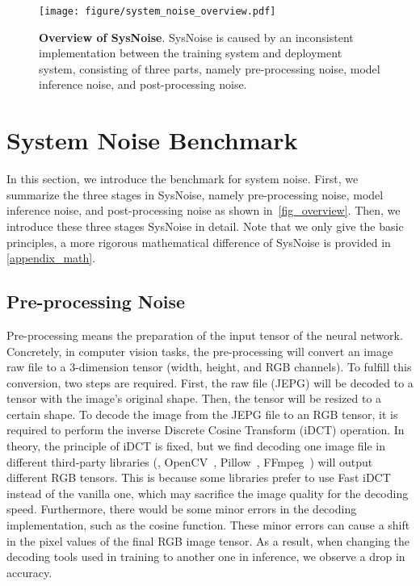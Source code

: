 \begin{figure*}[t]
    \centering
    \texttt{[image: figure/system\_noise\_overview.pdf]}
    \caption{\textbf{Overview of SysNoise}. SysNoise is caused by an inconsistent implementation between the training system and deployment system, consisting of three parts, namely pre-processing noise, model inference noise, and post-processing noise. }
    \label{fig_overview}
\end{figure*}

\section{System Noise Benchmark}

In this section, we introduce the benchmark for system noise. First, we summarize the three stages in SysNoise, namely pre-processing noise, model inference noise, and post-processing noise as shown in~\autoref{fig_overview}. Then, we introduce these three stages SysNoise in detail. Note that we only give the basic principles, a more rigorous mathematical difference of SysNoise is provided in \autoref{appendix_math}. 


\subsection{Pre-processing Noise}
\label{sec_prep}
Pre-processing means the preparation of the input tensor of the neural network. Concretely, in computer vision tasks, the pre-processing will convert an image raw file to a 3-dimension tensor (width, height, and RGB channels). To fulfill this conversion, two steps are required. First, the raw file (JEPG) will be decoded to a tensor with the image's original shape. Then, the tensor will be resized to a certain shape. %
To decode the image from the JEPG file to an RGB tensor, it is required to perform the inverse Discrete Cosine Transform (iDCT) operation. 
In theory, the principle of iDCT is fixed, but we find decoding one image file in different third-party libraries (\eg, OpenCV~\cite{opencv_library}, Pillow~\cite{umesh2012image}, FFmpeg~\cite{tomar2006converting}) will output different RGB tensors. This is because some libraries prefer to use Fast iDCT~\cite{chen1977fast} instead of the vanilla one, which may sacrifice the image quality for the decoding speed. 
Furthermore, there would be some minor errors in the decoding implementation, such as the cosine function. These minor errors can cause a shift in the pixel values of the final RGB image tensor.
As a result, when changing the decoding tools used in training to another one in inference, we observe a drop in accuracy.

